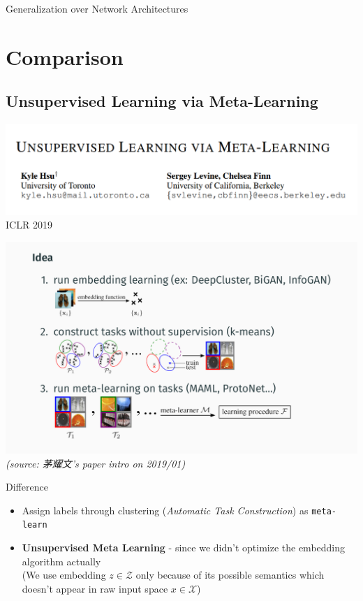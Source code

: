 \documentclass{beamer}
\begin{document}
\begin{frame}{Generalization over Network Architectures}
\end{frame}

\section{Comparison}
\subsection{Unsupervised Learning via Meta-Learning}

\begin{frame}
  \includegraphics[width=\textwidth]{fig/ULML.png}
  \center ICLR 2019
\end{frame}

\begin{frame}
  \includegraphics[width=\textwidth]{fig/ULML-flow.png}
  \textit{(source: 茅耀文's paper intro on 2019/01)}
\end{frame}

\begin{frame}{Difference}
  \begin{itemize}
    \item Assign labels through clustering (\textit{Automatic Task Construction}) as \texttt{meta-learn}
    \item \textbf{Unsupervised Meta Learning} - since we didn't optimize the embedding algorithm actually\\
      (We use embedding $z \in \mathcal{Z}$ only because of its possible semantics which doesn't appear in raw input space $x \in \mathcal{X}$)
  \end{itemize}
\end{frame}
\end{document}
